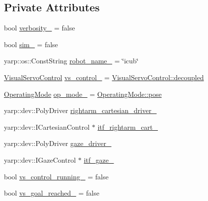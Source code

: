 \subsection*{Private Attributes}
\begin{DoxyCompactItemize}
\item 
bool \hyperlink{classVisualServoingServer_a559b6106818be3b9c48352b614e658c7}{verbosity\+\_\+} = false
\item 
bool \hyperlink{classVisualServoingServer_ad847ce0f5480013481f037bc554ae96e}{sim\+\_\+} = false
\item 
yarp\+::os\+::\+Const\+String \hyperlink{classVisualServoingServer_adb8cccbe6de08ec4b686d2eca8a99dfd}{robot\+\_\+name\+\_\+} = \char`\"{}icub\char`\"{}
\item 
\hyperlink{classVisualServoingServer_ad7f000a91f0fc3423b86f2d2a584c4d3}{Visual\+Servo\+Control} \hyperlink{classVisualServoingServer_ac8da8eea9620e8cce4ba2502bb1ec86a}{vs\+\_\+control\+\_\+} = \hyperlink{classVisualServoingServer_ad7f000a91f0fc3423b86f2d2a584c4d3a8c5f04f9df63b44bea9b7edcb4dd1038}{Visual\+Servo\+Control\+::decoupled}
\item 
\hyperlink{classVisualServoingServer_ab4ac95327e1829713374ca3cd0dec915}{Operating\+Mode} \hyperlink{classVisualServoingServer_af6b808cf1ef56df5fb432196335e1ceb}{op\+\_\+mode\+\_\+} = \hyperlink{classVisualServoingServer_ab4ac95327e1829713374ca3cd0dec915a2d5f8ae9328c6535be72ed28bff47560}{Operating\+Mode\+::pose}
\item 
yarp\+::dev\+::\+Poly\+Driver \hyperlink{classVisualServoingServer_a46e47b0abc5b52fbba314cf9c2ce0df5}{rightarm\+\_\+cartesian\+\_\+driver\+\_\+}
\item 
yarp\+::dev\+::\+I\+Cartesian\+Control $\ast$ \hyperlink{classVisualServoingServer_a62c8f5c6ba2d62db4754d94984b98632}{itf\+\_\+rightarm\+\_\+cart\+\_\+}
\item 
yarp\+::dev\+::\+Poly\+Driver \hyperlink{classVisualServoingServer_a5da42a79826f631e1e40b723e3620c0a}{gaze\+\_\+driver\+\_\+}
\item 
yarp\+::dev\+::\+I\+Gaze\+Control $\ast$ \hyperlink{classVisualServoingServer_ac884095733af31af336373edbe09eae3}{itf\+\_\+gaze\+\_\+}
\item 
bool \hyperlink{classVisualServoingServer_aeb48fa3b045d9fb074b03ea9d8441972}{vs\+\_\+control\+\_\+running\+\_\+} = false
\item 
bool \hyperlink{classVisualServoingServer_aae9c2aa802fa83d8b77b5094af94fa38}{vs\+\_\+goal\+\_\+reached\+\_\+} = false
\item 

\end{DoxyCompactItemize}

